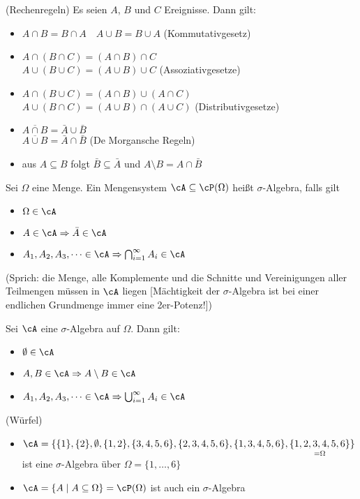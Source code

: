 \documentclass{scrreprt}
\begin{document}
 (Rechenregeln) Es seien $A$, $B$ und $C$ Ereignisse. Dann gilt:
\begin{itemize}
\item $A \cap B = B \cap A \quad A \cup B = B \cup A$ \tab(Kommutativgesetz)
\item $A \cap (B \cap C)=(A \cap B) \cap C$\\
$A \cup (B \cup C) = (A \cup B ) \cup C$ \tab\tab (Assoziativgesetze)
\item $A \cap (B \cup C) = (A \cap B) \cup (A \cap C)$\\
$A \cup(B \cap C) = (A \cup B) \cap (A \cup C)$ \tab (Distributivgesetze)
\item $\overline{A\cap B} = \bar A \cup \bar B$\\
$\overline{A \cup B} = \bar A \cap \bar B$ \tab\tab (De Morgansche Regeln)
\item aus $A \subseteq B$ folgt $\bar B \subseteq \bar A$ und $A\setminus B=A \cap \bar B$
\end{itemize}

 Sei $\Omega$ eine Menge. Ein Mengensystem $\cA\subseteq \cP(\Omega)$ heißt $\sigma$-Algebra, falls gilt
\begin{itemize}
\item $\Omega \in \cA$
\item $A \in \cA \Rightarrow \bar A \in \cA$
\item $A_1, A_2, A_3, \dots \in \cA \Rightarrow \bigcap_{i=1}^\infty A_i \in \cA$
\end{itemize}
(Sprich: die Menge, alle Komplemente und die Schnitte und Vereinigungen aller Teilmengen müssen in $\cA$ liegen [Mächtigkeit der $\sigma$-Algebra ist bei einer endlichen Grundmenge immer eine 2er-Potenz!])

 Sei $\cA$ eine $\sigma$-Algebra auf $\Omega$. Dann gilt:
\begin{itemize}
\item $\emptyset \in \cA$
\item $A, B \in \cA \Rightarrow A \setminus B \in \cA$
\item $A_1, A_2,A_3,\dots \in \cA \Rightarrow \bigcup_{i=1}^\infty A_i \in \cA$
\end{itemize}

 (Würfel)
\begin{itemize}
\item $\cA=\{\{1\},\{2\},\emptyset, \{1,2\}, \{3,4,5,6\}, \{2,3,4,5,6\}, \{1,3,4,5,6\}, \underset{=\Omega}{\{1,2,3,4,5,6\} }\}$ ist eine $\sigma$-Algebra über $\Omega=\{1,\dots,6\}$
\item $\cA=\{A \;|\; A \subseteq \Omega\} = \cP(\Omega)$ ist auch ein $\sigma$-Algebra
\end{itemize}
\end{document}
